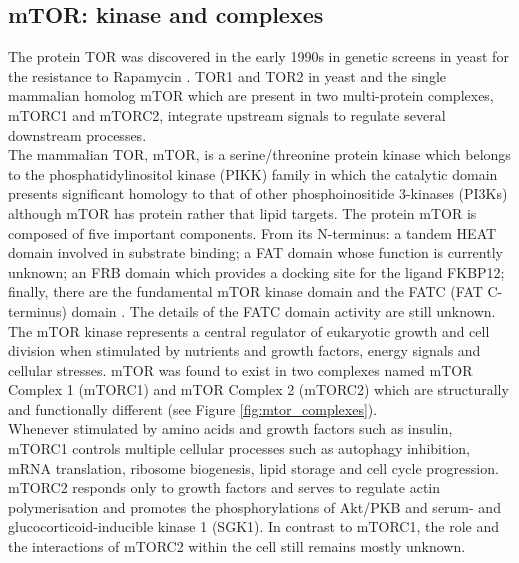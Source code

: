 \subsection{mTOR: kinase and complexes}
\label{subsec:mTOR: kinase and complexes}
The protein TOR was discovered in the early 1990s in genetic screens in yeast for the resistance to Rapamycin \citep{Heitman1991}. TOR1 and TOR2 in yeast and the single mammalian homolog mTOR which are present in two multi-protein complexes, mTORC1 and mTORC2, integrate upstream signals to regulate several downstream processes.\\
The mammalian TOR, mTOR, is a serine/threonine protein kinase which belongs to the phosphatidylinositol kinase (PIKK) family in which the catalytic domain presents significant homology to that of other phosphoinositide 3-kinases (PI3Ks) although mTOR has protein rather that lipid targets. The protein mTOR is composed of five important components. From its N-terminus: a tandem HEAT domain involved in substrate binding; a FAT domain whose function is currently unknown; an FRB domain which provides a docking site for the ligand FKBP12; finally, there are the fundamental mTOR kinase domain and the FATC (FAT C-terminus) domain \citep{Wullschleger2006, Hay2004}. The details of the FATC domain activity are still unknown.\\
The mTOR kinase represents a central regulator of eukaryotic growth and cell division when stimulated by nutrients and growth factors, energy signals and cellular stresses. mTOR was found to exist in two complexes named mTOR Complex 1 (mTORC1) and mTOR Complex 2 (mTORC2) which are structurally and functionally different (see Figure \ref{fig:mtor_complexes}).\\
Whenever stimulated by amino acids and growth factors such as insulin, mTORC1 controls multiple cellular processes such as autophagy inhibition, mRNA translation, ribosome biogenesis, lipid storage and cell cycle progression. mTORC2 responds only to growth factors and serves to regulate actin polymerisation and promotes the phosphorylations of Akt/PKB and serum- and glucocorticoid-inducible kinase 1 (SGK1). In contrast to mTORC1, the role and the interactions of mTORC2 within the cell still remains mostly unknown. 

